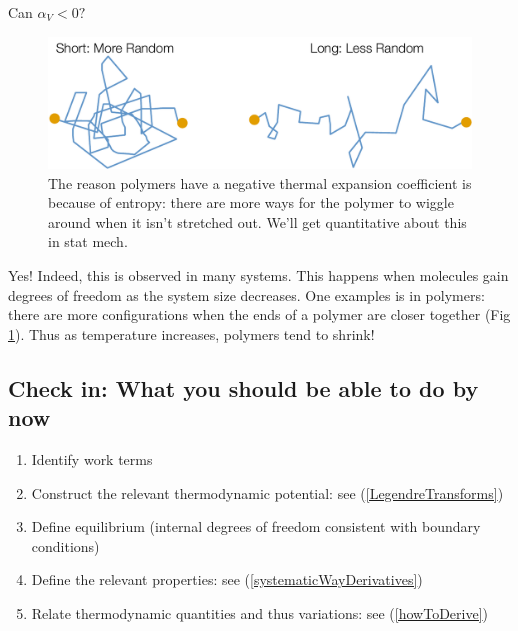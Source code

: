 \documentclass[12pt]{article}
\begin{document}
Can $\alpha_V < 0?$
\begin{figure}[h]
\centering
\includegraphics[width=\textwidth]{Short_and_Long_Comparison}
\caption{The reason polymers have a negative thermal expansion coefficient is because of entropy: there are more ways for the polymer to wiggle around when it isn't stretched out. We'll get quantitative about this in stat mech.}
\label{shortLongEntropy}
\end{figure}
Yes! Indeed, this is observed in many systems. This happens when molecules gain degrees of freedom as the system size decreases. One examples is in polymers: there are more configurations when the ends of a polymer are closer together (Fig \ref{shortLongEntropy}). Thus as temperature increases, polymers tend to shrink!


\subsection{Check in: What you should be able to do by now}

\begin{enumerate}[(1)]
\item Identify work terms
\item Construct the relevant thermodynamic potential: see (\ref{LegendreTransforms})
\item Define equilibrium (internal degrees of freedom consistent with boundary conditions) 
\item Define the relevant properties: see (\ref{systematicWayDerivatives})
\item Relate thermodynamic quantities and thus variations: see (\ref{howToDerive})
\end{enumerate}
\end{document}
